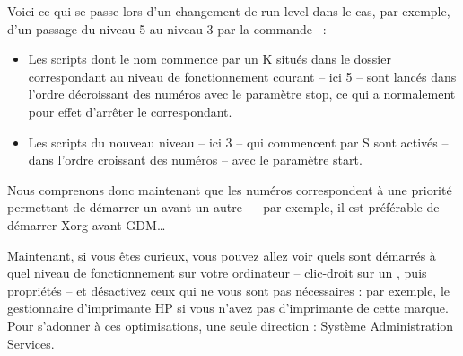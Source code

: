 Voici ce qui se passe lors d'un changement de run level dans le cas, par exemple, d'un passage du niveau 5 au niveau 3 par la commande ~:\par
\begin{itemize}
\item Les scripts dont le nom commence par un K situés dans le dossier correspondant au niveau de fonctionnement courant -- ici 5 -- sont lancés dans l'ordre décroissant des numéros avec le paramètre stop, ce qui a normalement pour effet d'arrêter le  correspondant. 
\item Les scripts du nouveau niveau -- ici 3 -- qui commencent par S sont activés -- dans l'ordre croissant des numéros -- avec le paramètre start. 
\end{itemize}
Nous comprenons donc maintenant que les numéros correspondent à une priorité permettant de démarrer un  avant un autre --- par exemple, il est préférable de démarrer Xorg avant GDM\ldots{}\par
Maintenant, si vous êtes curieux, vous pouvez allez voir quels  sont démarrés à quel niveau de fonctionnement sur votre ordinateur -- clic-droit sur un , puis propriétés -- et désactivez ceux qui ne vous sont pas nécessaires : par exemple, le gestionnaire d'imprimante HP si vous n'avez pas d'imprimante de cette marque. Pour s'adonner à ces optimisations, une seule direction : Système \FlecheDroite Administration \FlecheDroite Services.
